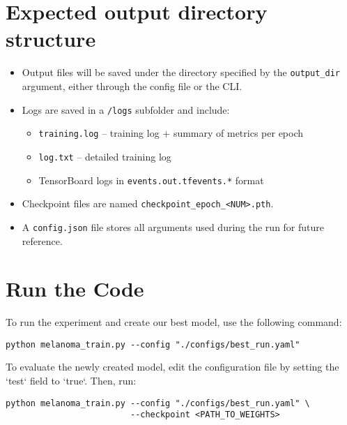\section{Expected output directory structure}
\begin{itemize}
    \item Output files will be saved under the directory specified by the \texttt{output\_dir} argument, either through the config file or the CLI.
    \item Logs are saved in a \texttt{/logs} subfolder and include:
    \begin{itemize}
        \item \texttt{training.log} – training log + summary of metrics per epoch
        \item \texttt{log.txt} – detailed training log
        \item TensorBoard logs in \texttt{events.out.tfevents.*} format
    \end{itemize}
    \item Checkpoint files are named \texttt{checkpoint\_epoch\_<NUM>.pth}.
    \item A \texttt{config.json} file stores all arguments used during the run for future reference.
\end{itemize}

\section{Run the Code}

To run the experiment and create our best model, use the following command:

\begin{lstlisting}
python melanoma_train.py --config "./configs/best_run.yaml"
\end{lstlisting}

To evaluate the newly created model, edit the configuration file  by setting the `test` field to `true`. Then, run:

\begin{lstlisting}
python melanoma_train.py --config "./configs/best_run.yaml" \
                         --checkpoint <PATH_TO_WEIGHTS>
\end{lstlisting}
